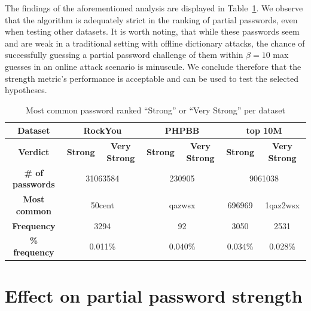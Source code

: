   The findings of the aforementioned analysis are displayed in Table~\ref{tab:str_correct}. We observe that the algorithm is adequately strict in the ranking of partial passwords, even when testing other datasets. It is worth noting, that while these passwords seem and are weak in a traditional setting with offline dictionary attacks, the chance of successfully guessing a partial password challenge of them within $\beta = 10$ max guesses in an online attack scenario is minuscule. We conclude therefore that the strength metric's performance is acceptable and can be used to test the selected hypotheses.

  \begin{table}[htpb]
    \centering
    \small
    \hspace*{-1.5cm}
    \begin{tabular}{|c||c|c|c|c|c|c|}
      \hline
      \textbf{Dataset} & \multicolumn{2}{|c|}{\textbf{RockYou}} & \multicolumn{2}{|c|}{\textbf{PHPBB}} & \multicolumn{2}{|c|}{\textbf{top 10M}} \\
      \hline
      \textbf{Verdict} & \textbf{Strong} & \textbf{Very Strong} & \textbf{Strong} & \textbf{Very Strong} & \textbf{Strong} & \textbf{Very Strong} \\
      \hline
      \textbf{\# of passwords} & \multicolumn{2}{|c|}{31063584} & \multicolumn{2}{|c|}{230905} & \multicolumn{2}{|c|}{9061038} \\ \hline
      \textbf{Most common} & \multicolumn{2}{|c|}{50cent} & \multicolumn{2}{|c|}{qazwsx} & 696969 & 1qaz2wsx \\ \hline
      \textbf{Frequency} & \multicolumn{2}{|c|}{3294} & \multicolumn{2}{|c|}{92} & 3050 & 2531 \\ \hline
      \textbf{\% frequency} & \multicolumn{2}{|c|}{0.011\%} & \multicolumn{2}{|c|}{0.040\%} & 0.034\% & 0.028\% \\ \hline
    \end{tabular}
    \caption{Most common password ranked ``Strong'' or ``Very Strong'' per dataset}
    \label{tab:str_correct}
  \end{table}

\section{Effect on partial password strength}
  \label{sec:useability}

